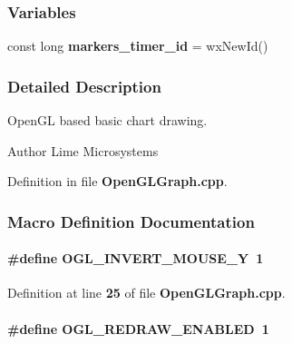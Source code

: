 \subsubsection*{Variables}
\begin{DoxyCompactItemize}
\item 
const long {\bf markers\+\_\+timer\+\_\+id} = wx\+New\+Id()
\end{DoxyCompactItemize}


\subsubsection{Detailed Description}
Open\+GL based basic chart drawing. 

\begin{DoxyAuthor}{Author}
Lime Microsystems 
\end{DoxyAuthor}


Definition in file {\bf Open\+G\+L\+Graph.\+cpp}.



\subsubsection{Macro Definition Documentation}
\paragraph[{O\+G\+L\+\_\+\+I\+N\+V\+E\+R\+T\+\_\+\+M\+O\+U\+S\+E\+\_\+Y}]{\setlength{\rightskip}{0pt plus 5cm}\#define O\+G\+L\+\_\+\+I\+N\+V\+E\+R\+T\+\_\+\+M\+O\+U\+S\+E\+\_\+Y~1}\label{OpenGLGraph_8cpp_aaed5877a4e416006111b363a1cddd85e}


Definition at line {\bf 25} of file {\bf Open\+G\+L\+Graph.\+cpp}.

\paragraph[{O\+G\+L\+\_\+\+R\+E\+D\+R\+A\+W\+\_\+\+E\+N\+A\+B\+L\+ED}]{\setlength{\rightskip}{0pt plus 5cm}\#define O\+G\+L\+\_\+\+R\+E\+D\+R\+A\+W\+\_\+\+E\+N\+A\+B\+L\+ED~1}\label{OpenGLGraph_8cpp_af27416b498e7d9108e075edf801f9291}


